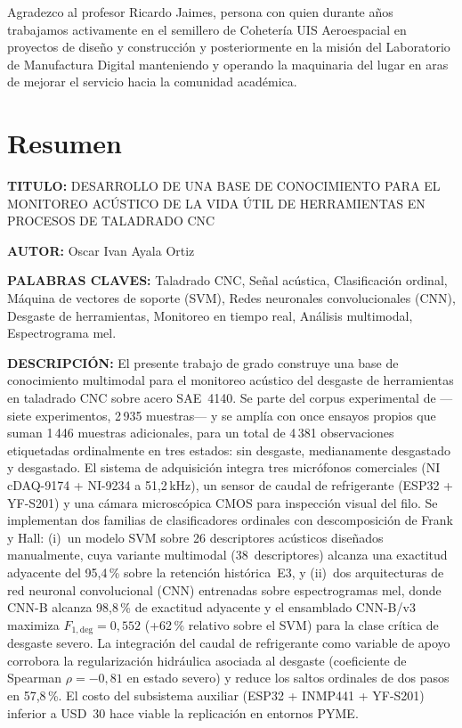 \documentclass[12pt, letterpaper]{report}
\begin{document}
Agradezco al profesor Ricardo Jaimes, persona con quien durante años trabajamos
activamente en el semillero de Cohetería UIS Aeroespacial en proyectos de diseño y
construcción y posteriormente en la misión del Laboratorio de Manufactura Digital
manteniendo y operando la maquinaria del lugar en aras de mejorar el servicio hacia la
comunidad académica.


\tableofcontents
\clearpage

\listoftables
\clearpage

\listoffigures
\clearpage

\clearpage
\chapter*{Resumen}

\textbf{TITULO:}\textbf{ }DESARROLLO DE UNA BASE DE CONOCIMIENTO PARA EL MONITOREO ACÚSTICO DE LA VIDA ÚTIL DE HERRAMIENTAS EN PROCESOS DE TALADRADO CNC

\textbf{AUTOR:}\textbf{ }Oscar Ivan Ayala Ortiz

\textbf{PALABRAS CLAVES:} Taladrado CNC, Señal acústica, Clasificación ordinal, Máquina de vectores de soporte (SVM), Redes neuronales convolucionales (CNN), Desgaste de herramientas, Monitoreo en tiempo real, Análisis multimodal, Espectrograma mel.

\textbf{DESCRIPCIÓN:} El presente trabajo de grado construye una base de conocimiento multimodal para el monitoreo acústico del desgaste de herramientas en taladrado CNC sobre acero SAE~4140. Se parte del corpus experimental de  ---siete experimentos, 2\,935 muestras--- y se amplía con once ensayos propios que suman 1\,446 muestras adicionales, para un total de 4\,381 observaciones etiquetadas ordinalmente en tres estados: sin desgaste, medianamente desgastado y desgastado. El sistema de adquisición integra tres micrófonos comerciales (NI cDAQ-9174 + NI-9234 a 51,2\,kHz), un sensor de caudal de refrigerante (ESP32 + YF-S201) y una cámara microscópica CMOS para inspección visual del filo. Se implementan dos familias de clasificadores ordinales con descomposición de Frank y Hall: (i)~un modelo SVM sobre 26 descriptores acústicos diseñados manualmente, cuya variante multimodal (38~descriptores) alcanza una exactitud adyacente del 95,4\,\% sobre la retención histórica~E3, y (ii)~dos arquitecturas de red neuronal convolucional (CNN) entrenadas sobre espectrogramas mel, donde CNN-B alcanza 98,8\,\% de exactitud adyacente y el ensamblado CNN-B/v3 maximiza $F_{1,\text{deg}} = 0{,}552$ (+62\,\% relativo sobre el SVM) para la clase crítica de desgaste severo. La integración del caudal de refrigerante como variable de apoyo corrobora la regularización hidráulica asociada al desgaste (coeficiente de Spearman $\rho = -0{,}81$ en estado severo) y reduce los saltos ordinales de dos pasos en 57,8\,\%. El costo del subsistema auxiliar (ESP32 + INMP441 + YF-S201) inferior a USD~30 hace viable la replicación en entornos PYME.
\end{document}
